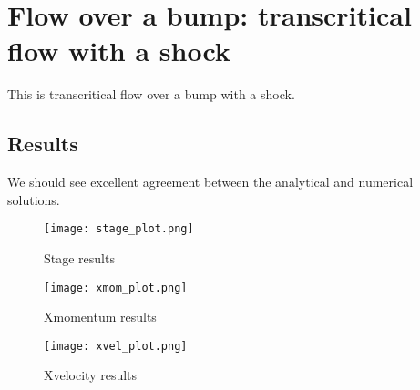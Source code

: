 
\section{Flow over a bump: transcritical flow with a shock}

This is transcritical flow over a bump with a shock.

\subsection{Results}


We should see excellent agreement between the analytical and numerical solutions.

\begin{figure}[h]
\begin{center}
\texttt{[image: stage\_plot.png]}
\end{center}
\caption{Stage results}
\end{figure}


\begin{figure}[h]
\begin{center}
\texttt{[image: xmom\_plot.png]}
\end{center}
\caption{Xmomentum results}
\end{figure}


\begin{figure}[h]
\begin{center}
\texttt{[image: xvel\_plot.png]}
\end{center}
\caption{Xvelocity results}
\end{figure}


\endinput
